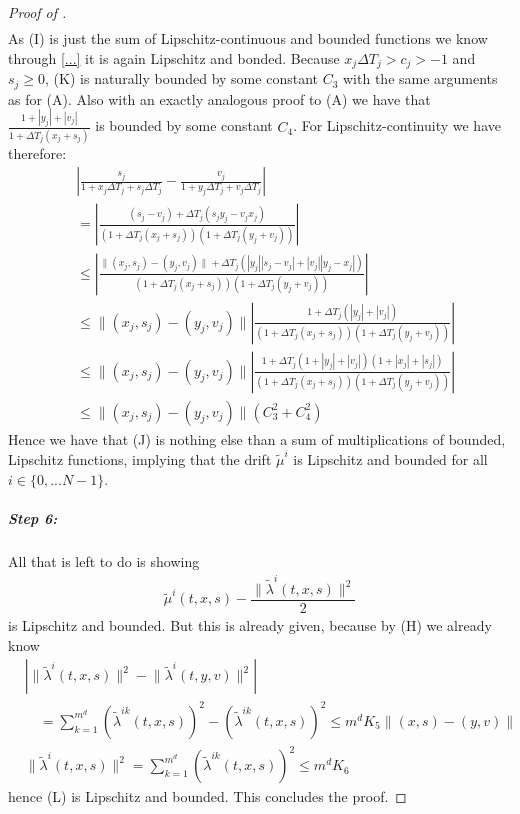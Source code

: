 \documentclass[12pt]{article}
\begin{document}
\begin{proof}[Proof of ]
\begin{align*}
		\end{align*}
		As (I) is just the sum of Lipschitz-continuous and bounded functions we know through \cref{...} it is again Lipschitz and bonded. Because $x_j\Delta T_j > c_j > -1$ and $s_j \ge 0$, (K) is naturally bounded by some constant $C_3$ with the same arguments as for (A). Also with an exactly analogous proof to (A) we have that $\frac{1 + \left|y_j\right| + \left|v_j\right|}{1 + \Delta T_j(x_j + s_j)}$ is bounded by some constant $C_4$. For Lipschitz-continuity we have therefore:
		\begin{align*}
			&\left|\frac{s_j}{1 + x_j\Delta T_j + s_j\Delta T_j} - \frac{v_j}{1 + y_j\Delta T_j + v_j\Delta T_j} \right|\\
			&=\left|\frac{(s_j - v_j) + \Delta T_j(s_j y_j - v_jx_j)}{\left(1 + \Delta T_j(x_j + s_j)\right)\left(1 + \Delta T_j(y_j + v_j)\right)}\right|\\
			&\le \left|\frac{\lVert (x_j,s_j) - (y_j, v_j)\rVert + \Delta T_j(\left|y_j\right| \left|s_j - v_j\right| + \left|v_j\right| \left|y_j - x_j\right|)}{\left(1 + \Delta T_j(x_j + s_j)\right)\left(1 + \Delta T_j(y_j + v_j)\right)}\right|\\
			&\le \lVert (x_j,s_j) - (y_j, v_j)\rVert\left|\frac{1 + \Delta T_j(\left|y_j\right| + \left|v_j\right|)}{\left(1 + \Delta T_j(x_j + s_j)\right)\left(1 + \Delta T_j(y_j + v_j)\right)}\right|\\
			&\le \lVert (x_j,s_j) - (y_j, v_j)\rVert\left|\frac{1 + \Delta T_j\left(1 + \left|y_j\right| + \left|v_j\right|\right)\left(1 + \left|x_j\right| + \left|s_j\right|\right)}{\left(1 + \Delta T_j(x_j + s_j)\right)\left(1 + \Delta T_j(y_j + v_j)\right)}\right|\\
			&\le \lVert (x_j,s_j) - (y_j, v_j)\rVert  \left(C_3^2 + C_4^2\right)
		\end{align*}
		Hence we have that (J) is nothing else than a sum of multiplications of bounded, Lipschitz functions, implying that the drift $\tilde{\mu}^{i}$ is Lipschitz and bounded for all $i\in\{0,...N-1\}$.
		\subparagraph{Step 6:}
		All that is left to do is showing 
		\begin{align*}
			\tilde{\mu}^i\left(t, x, s\right) - \dfrac{\lVert\tilde{\lambda}^{i}(t,x,s)\rVert^2}{2}\tag{L}
		\end{align*}
		is Lipschitz and bounded. But this is already given, because by (H) we already know 
		\begin{align*}
			&\left| \lVert\tilde{\lambda}^{i}(t,x,s)\rVert ^2 - \lVert\tilde{\lambda}^{i}(t,y,v)\rVert ^2\right| \\
			&\quad= \sum_{k=1}^{m^d}\left(\tilde{\lambda}^{i k}(t,x,s)\right)^2 - \left(\tilde{\lambda}^{i k}(t,x,s)\right)^2 \le m^dK_5\lVert(x,s) - (y,v)\rVert\\
			&\lVert\tilde{\lambda}^{i}(t,x,s)\rVert ^2 = \sum_{k=1}^{m^d}\left(\tilde{\lambda}^{i k}(t,x,s)\right)^2 \le m^d K_6
		\end{align*}
		hence (L) is Lipschitz and bounded. This concludes the proof.		
	\end{proof}
	
\end{document}
